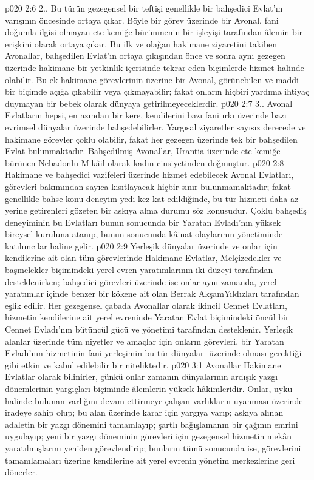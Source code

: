 \vs p020 2:6 2.\bibnobreakspace {}. Bu türün gezegensel bir teftişi genellikle bir bahşedici Evlat’ın varışının öncesinde ortaya çıkar. Böyle bir görev üzerinde bir Avonal, fani doğumla ilgisi olmayan ete kemiğe bürünmenin bir işleyişi tarafından âlemin bir erişkini olarak ortaya çıkar. Bu ilk ve olağan hakimane ziyaretini takiben Avonallar, bahşedilen Evlat’ın ortaya çıkışından önce ve sonra aynı gezegen üzerinde hakimane bir yetkinlik içerisinde tekrar eden biçimlerde hizmet halinde olabilir. Bu ek hakimane görevlerinin üzerine bir Avonal, görünebilen ve maddi bir biçimde açığa çıkabilir veya çıkmayabilir; fakat onların hiçbiri yardıma ihtiyaç duymayan bir bebek olarak dünyaya getirilmeyeceklerdir.
\vs p020 2:7 3.\bibnobreakspace {}. Avonal Evlatların hepsi, en azından bir kere, kendilerini bazı fani ırkı üzerinde bazı evrimsel dünyalar üzerinde bahşedebilirler. Yargısal ziyaretler sayısız derecede ve hakimane görevler çoklu olabilir, fakat her gezegen üzerinde tek bir bahşedilen Evlat bulunmaktadır. Bahşedilmiş Avonallar, Urantia üzerinde ete kemiğe bürünen Nebadonlu Mikâil olarak kadın cinsiyetinden doğmuştur.
\vs p020 2:8 Hakimane ve bahşedici vazifeleri üzerinde hizmet edebilecek Avonal Evlatları, görevleri bakımından sayıca kısıtlayacak hiçbir sınır bulunmamaktadır; fakat genellikle bahse konu deneyim yedi kez kat edildiğinde, bu tür hizmeti daha az yerine getirenleri gözeten bir askıya alma durumu söz konusudur. Çoklu bahşediş deneyiminin bu Evlatları bunun sonucunda bir Yaratan Evladı’nın yüksek bireysel kuruluna atanıp, bunun sonucunda kâinat olaylarının yönetiminde katılımcılar haline gelir.
\vs p020 2:9 Yerleşik dünyalar üzerinde ve onlar için kendilerine ait olan tüm görevlerinde Hakimane Evlatlar, Melçizedekler ve başmelekler biçimindeki yerel evren yaratımlarının iki düzeyi tarafından desteklenirken; bahşedici görevleri üzerinde ise onlar aynı zamanda, yerel yaratımlar içinde benzer bir kökene ait olan Berrak AkşamYıldızları tarafından eşlik edilir. Her gezegensel çabada Avonallar olarak ikincil Cennet Evlatları, hizmetin kendilerine ait yerel evreninde Yaratan Evlat biçimindeki öncül bir Cennet Evladı’nın bütüncül gücü ve yönetimi tarafından desteklenir. Yerleşik alanlar üzerinde tüm niyetler ve amaçlar için onların görevleri, bir Yaratan Evladı’nın hizmetinin fani yerleşimin bu tür dünyaları üzerinde olması gerektiği gibi etkin ve kabul edilebilir bir niteliktedir.
\vs p020 3:1 Avonallar Hakimane Evlatlar olarak bilinirler, çünkü onlar zamanın dünyalarının ardışık yazgı dönemlerinin yargıçları biçiminde âlemlerin yüksek hâkimleridir. Onlar, uyku halinde bulunan varlığını devam ettirmeye çalışan varlıkların uyanması üzerinde iradeye sahip olup; bu alan üzerinde karar için yargıya varıp; askıya alınan adaletin bir yazgı dönemini tamamlayıp; şartlı bağışlamanın bir çağının emrini uygulayıp; yeni bir yazgı döneminin görevleri için gezegensel hizmetin mekân yaratılmışlarını yeniden görevlendirip; bunların tümü sonucunda ise, görevlerini tamamlamaları üzerine kendilerine ait yerel evrenin yönetim merkezlerine geri dönerler.
